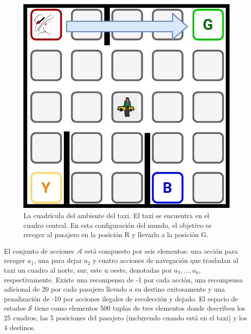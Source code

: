 \begin{figure}[H]
    \centering
    \includegraphics[scale=0.25]{Chapter5/Figs/taxi-env.pdf}
    \caption{La cuadrícula del ambiente del taxi. El taxi se encuentra en el cuadro central. En esta configuración del mundo, el objetivo es recoger al pasajero en la posición R y llevarlo a la posición G.}
    \label{fig:taxi}
\end{figure}

El conjunto de acciones $\mathcal{A}$ está compuesto por seis elementos: una acción para recoger $a_1$, una para dejar $a_2$ y
cuatro acciones de 
navegación que trasladan al taxi un cuadro al norte, sur, 
este u oeste, denotadas por $a_3, \dots, a_6$, respectivamente.
Existe una recompensa de -1 por cada acción, una recompensa adicional de 20 por cada pasajero llevado a su destino 
exitosamente y una penalización de -10 por acciones ilegales
de recolección y dejado.
El espacio de estados $\mathcal{S}$ tiene como elementos 
500 tuplas de tres elementos donde describen los 25 cuadros, las 5 posiciones del pasajero (incluyendo cuando está en el taxi) y los 4 destinos.


